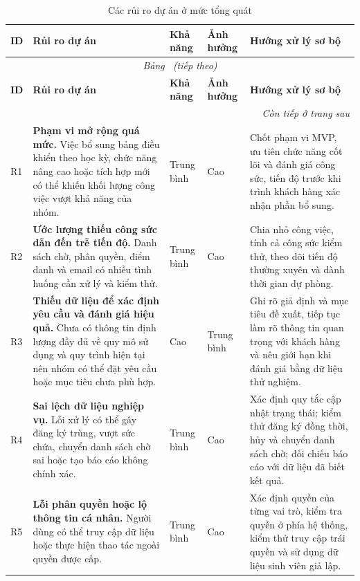 {%
\setlength{\tabcolsep}{3pt}
\renewcommand{\arraystretch}{1.2}
\begin{longtable}{|p{0.7cm}|p{5.1cm}|p{1.7cm}|p{1.5cm}|p{5.4cm}|}
\caption{Các rủi ro dự án ở mức tổng quát}\label{tab:high-level-risks}\\
\hline
\textbf{ID} & \textbf{Rủi ro dự án} & \textbf{Khả năng} & \textbf{Ảnh hưởng} & \textbf{Hướng xử lý sơ bộ} \\
\hline
\endfirsthead
\multicolumn{5}{c}{\textit{Bảng~\thetable{} (tiếp theo)}}\\
\hline
\textbf{ID} & \textbf{Rủi ro dự án} & \textbf{Khả năng} & \textbf{Ảnh hưởng} & \textbf{Hướng xử lý sơ bộ} \\
\hline
\endhead
\hline
\multicolumn{5}{r}{\textit{Còn tiếp ở trang sau}}\\
\endfoot
\hline
\endlastfoot
R1 & \textbf{Phạm vi mở rộng quá mức.} Việc bổ sung bảng điều khiển theo học kỳ, chức năng nâng cao hoặc tích hợp mới có thể khiến khối lượng công việc vượt khả năng của nhóm. & Trung bình & Cao & Chốt phạm vi MVP, ưu tiên chức năng cốt lõi và đánh giá công sức, tiến độ trước khi trình khách hàng xác nhận phần bổ sung. \\
\hline
R2 & \textbf{Ước lượng thiếu công sức dẫn đến trễ tiến độ.} Danh sách chờ, phân quyền, điểm danh và email có nhiều tình huống cần xử lý và kiểm thử. & Trung bình & Cao & Chia nhỏ công việc, tính cả công sức kiểm thử, theo dõi tiến độ thường xuyên và dành thời gian dự phòng. \\
\hline
R3 & \textbf{Thiếu dữ liệu để xác định yêu cầu và đánh giá hiệu quả.} Chưa có thông tin định lượng đầy đủ về quy mô sử dụng và quy trình hiện tại nên nhóm có thể đặt yêu cầu hoặc mục tiêu chưa phù hợp. & Cao & Trung bình & Ghi rõ giả định và mục tiêu đề xuất, tiếp tục làm rõ thông tin quan trọng với khách hàng và nêu giới hạn khi đánh giá bằng dữ liệu thử nghiệm. \\
\hline
R4 & \textbf{Sai lệch dữ liệu nghiệp vụ.} Lỗi xử lý có thể gây đăng ký trùng, vượt sức chứa, chuyển danh sách chờ sai hoặc tạo báo cáo không chính xác. & Trung bình & Cao & Xác định quy tắc cập nhật trạng thái; kiểm thử đăng ký đồng thời, hủy và chuyển danh sách chờ; đối chiếu báo cáo với dữ liệu đã biết kết quả. \\
\hline
R5 & \textbf{Lỗi phân quyền hoặc lộ thông tin cá nhân.} Người dùng có thể truy cập dữ liệu hoặc thực hiện thao tác ngoài quyền được cấp. & Trung bình & Cao & Xác định quyền của từng vai trò, kiểm tra quyền ở phía hệ thống, kiểm thử truy cập trái quyền và sử dụng dữ liệu sinh viên giả lập. \\

\end{longtable}}
